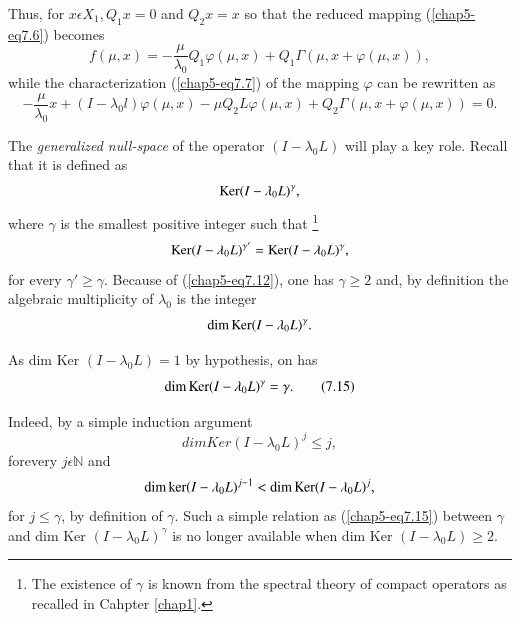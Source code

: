 Thus, for $x \epsilon X_{1}, Q_{1}x = 0$ and $Q_{2}x = x$ so that the
reduced mapping (\ref{chap5-eq7.6}) becomes
\begin{equation*}
f(\mu, x) = -\frac{\mu}{\lambda_{0}}Q_{1}\varphi(\mu, x) +
Q_{1}\Gamma(\mu, x + \varphi(\mu, x)),\tag{7.13}\label{chap5-eq7.13}
\end{equation*}
while the characterization (\ref{chap5-eq7.7}) of the mapping
$\varphi$ can be rewritten as
\begin{equation*}
-\frac{\mu}{\lambda_{0}}x + (I - \lambda_{0}l)\varphi(\mu, x) - \mu
Q_{2}L\varphi(\mu, x) + Q_{2}\Gamma(\mu, x + \varphi(\mu, x)) = 0.\tag{7.14}\label{chap5-eq7.14}
\end{equation*}

The {\em generalized null-space} of the operator $(I - \lambda_{0}L)$
will play a key role. Recall that it is defined as
$$
\operatorname{Ker} (I - \lambda_{0}L)^\gamma,
$$
where $\gamma$ is the smallest positive integer such
that \footnote{The existence of $\gamma$ is known from the spectral
  theory of compact operators as recalled in Cahpter \ref{chap1}.}
$$
\operatorname{Ker} (I - \lambda_{0}L)^{\gamma'} = \operatorname{Ker} (I - \lambda_{0}L)^\gamma,
$$
for every $\gamma' \geq \gamma$. Because of (\ref{chap5-eq7.12}), one
has $\gamma \geq 2$ and, by definition the algebraic multiplicity of
$\lambda_{0}$ is the integer
$$
\dim \operatorname{Ker} (I - \lambda_{0}L)^\gamma.
$$

\begin{remark}\label{chap5-rem7.1}
As dim Ker $(I - \lambda_{0}L) = 1$ by hypothesis, on has
\begin{equation*}
\dim \operatorname{Ker} (I - \lambda_{0}L)^\gamma = \gamma.\tag{7.15}\label{chap5-eq7.15}
\end{equation*}

Indeed, by a simple induction argument
\begin{equation*}
dim Ker (I - \lambda_{0}L)^{j} \leq j,\tag{7.16}\label{chap5-eq7.16}
\end{equation*}
for\pageoriginale every $j \epsilon \mathbb{N}$ and
$$
\dim \ker (I - \lambda_{0}L)^{j-1} < \dim \operatorname{Ker} (I - \lambda_{0}L)^{j},
$$
for $j \leq \gamma$, by definition of $\gamma$. Such a simple relation
as (\ref{chap5-eq7.15}) between $\gamma$ and dim Ker $(I -
\lambda_{0}L)^\gamma$ is no longer available when dim Ker $(I -
\lambda_{0}L) \geq 2$.
\end{remark}

